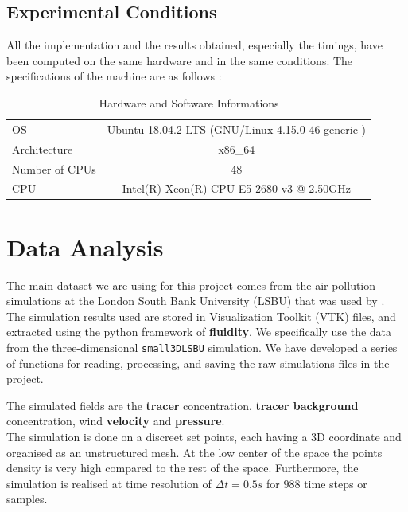 \subsection{Experimental Conditions}

All the implementation and the results obtained, especially the timings, have been computed on the same hardware and in the same conditions. The specifications of the machine are as follows :

\begin{table}[h!]
\centering
\begin{tabular}{l|c}
\toprule

OS & Ubuntu 18.04.2 LTS (GNU/Linux 4.15.0-46-generic ) \\ 
Architecture    &    x86\_64 \\ 

Number of CPUs          &    48\\ 

CPU     &    Intel(R) Xeon(R) CPU E5-2680 v3 @ 2.50GHz \\ \bottomrule

\end{tabular}
\caption{Hardware and Software Informations}
\end{table}



\section{Data Analysis}
The main dataset we are using for this project comes from the air pollution simulations at the London South Bank University (LSBU) that was used by \citet{arcucci_optimal_2019}.\\ 


The simulation results used are stored in Visualization Toolkit (VTK) files, and extracted using the python framework of \textbf{fluidity}. We specifically use the data from the three-dimensional \texttt{small3DLSBU} simulation. We have developed a series of functions for reading, processing, and saving the raw simulations files in the project. 

The simulated fields are the \textbf{tracer} concentration, \textbf{tracer background} concentration, wind \textbf{velocity} and \textbf{pressure}. \\


The simulation is done on a discreet set points, each having a 3D coordinate and organised as an unstructured mesh. At the low center of the space the points density is very high compared to the rest of the space. Furthermore, the simulation is realised at time resolution of $\Delta t = 0.5s$ for $988$ time steps or samples. \\
 
